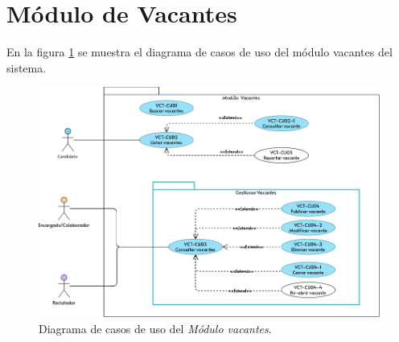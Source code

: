 	
	

	
	
	
	
	
	
	
	
	
	
	

	
	

	
	
	
	
	
	
	
	


	
	


\section{Módulo de Vacantes}
	En la figura \ref{adcu:usr} se muestra el diagrama de casos de uso del módulo vacantes del sistema.

	\begin{figure}[hbtp!]
		\begin{center}
			\includegraphics[width=.8\textwidth]{sprints/imagenes/MUVCT.png}
		\end{center}
		
		\caption{Diagrama de casos de uso del \textit{Módulo vacantes}.}
		\label{adcu:usr}
	\end{figure}

